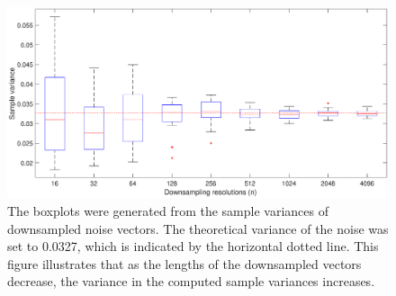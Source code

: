 \documentclass[12pt,notitlepage]{report}
\begin{document}
\begin{figure}[htb]
\centerline{\includegraphics[scale=0.45]{Figures/VarPlot1D_F1_S05_W100_R20.eps}}
\caption{The boxplots were generated from the sample variances of downsampled noise vectors. The theoretical variance of the noise was set to 0.0327, which is indicated by the horizontal dotted line. This figure illustrates that as the lengths of the downsampled vectors decrease, the variance in the computed sample variances increases.}
\label{VarPlot1D}
\end{figure}
\end{document}

